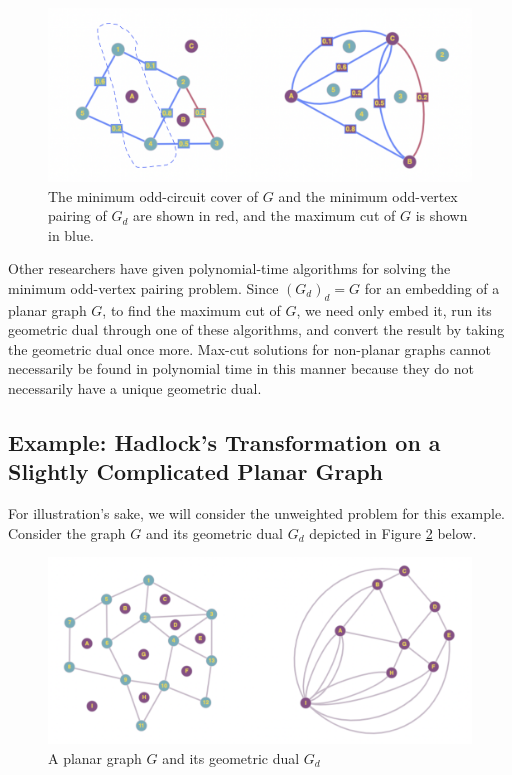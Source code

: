 \begin{figure}[h]
    \centering
    \includegraphics[scale=.35]{geom_dual_cut.png}
    \caption{The minimum odd-circuit cover of $G$ and the minimum odd-vertex pairing of $G_d$ are shown in red, and the maximum cut of $G$ is shown in blue.}
    \label{fig:hadlock_example}
\end{figure}

\par Other researchers have given polynomial-time algorithms for solving the minimum odd-vertex pairing problem.\cite{Hadlock} Since $(G_d)_d = G$ for an embedding of a planar graph $G$, to find the maximum cut of $G$, we need only embed it, run its geometric dual through one of these algorithms, and convert the result by taking the geometric dual once more. Max-cut solutions for non-planar graphs cannot necessarily be found in polynomial time in this manner because they do not necessarily have a unique geometric dual. \\

\newpage

\subsection{Example: Hadlock's Transformation on a Slightly Complicated Planar Graph}

\par For illustration's sake, we will consider the unweighted problem for this example. Consider the graph $G$ and its geometric dual $G_d$ depicted in Figure \ref{fig:slightly_complicated} below.

\begin{figure}[h]
    \centering
    \includegraphics[scale=.35]{planar_dual.png}
    \caption{A planar graph $G$ and its geometric dual $G_d$}
    \label{fig:slightly_complicated}
\end{figure}

